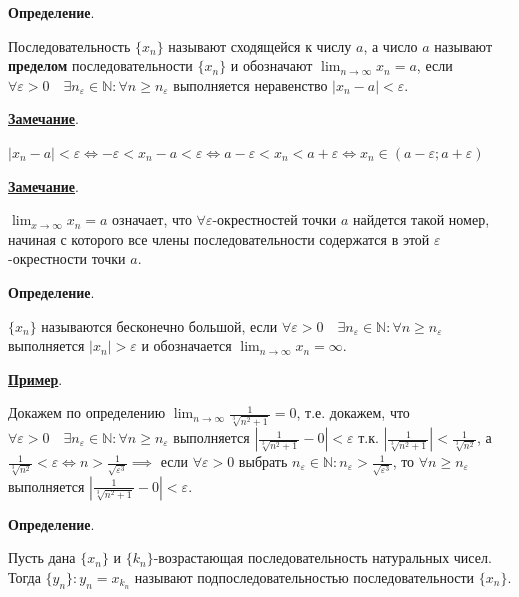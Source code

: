 \documentclass[a4paper,oneside]{article}
\newcommand{\parspace}{\vspace{10pt}}
\newcommand{\dslim}{\displaystyle\lim}
\newcommand{\dslimn}{\dslim_{n \to \infty}}
\begin{document}
\parspace

\textbf{Определение}.

Последовательность $\{x_n\}$ называют сходящейся к числу $a$, а число $a$ называют
\textbf{пределом} последовательности $\{x_n\}$ и обозначают 
$\displaystyle\lim_{n \rightarrow \infty} x_n = a$, если 
$\forall \varepsilon > 0 \quad \exists n_\varepsilon \in \mathbb{N}: \forall n \ge n_\varepsilon$
выполняется неравенство $|x_n - a| < \varepsilon$.

\parspace

\underline{\textbf{Замечание}}.

$|x_n - a| < \varepsilon \Leftrightarrow -\varepsilon < x_n - a < \varepsilon 
\Leftrightarrow a - \varepsilon < x_n < a + \varepsilon
\Leftrightarrow x_n \in (a - \varepsilon; a + \varepsilon)$

\parspace

\underline{\textbf{Замечание}}.

$\displaystyle\lim_{x \rightarrow \infty} x_n = a$ означает, что
$\forall \varepsilon$-окрестностей точки $a$ найдется такой номер, 
начиная с которого все члены последовательности содержатся в этой
$\varepsilon$-окрестности точки $a$.

\parspace

\textbf{Определение}.

$\{x_n\}$ называются бесконечно большой, если
$\forall \varepsilon > 0 \quad \exists n_\varepsilon \in \mathbb{N}:
\forall n \ge n_\varepsilon$ выполняется $|x_n| > \varepsilon$ и
обозначается $\dslimn x_n = \infty$.

\parspace

\underline{\textbf{Пример}}.

Докажем по определению 
$\dslimn \frac{1}{\sqrt[3]{n^2 + 1}} = 0$,
т.е. докажем, что $\forall \varepsilon > 0 \quad \exists n_\varepsilon \in \mathbb{N}:
\forall n \ge n_\varepsilon$ выполняется $\left|\frac{1}{\sqrt[3]{n^2 + 1}} - 0\right| < \varepsilon$
т.к. $\left|\frac{1}{\sqrt[3]{n^2 + 1}}\right| < \frac{1}{\sqrt[3]{n^2}}$,
а $\frac{1}{\sqrt[3]{n^2}} < \varepsilon \Leftrightarrow n > \frac{1}{\sqrt{\varepsilon^3}}
\implies$ если $\forall \varepsilon > 0$ выбрать 
$n_\varepsilon \in \mathbb{N}: n_\varepsilon > \frac{1}{\sqrt{\varepsilon^3}}$,
то $\forall n \ge n_\varepsilon$ выполняется $\left|\frac{1}{\sqrt[3]{n^2 + 1}} - 0\right| < \varepsilon$.

\parspace

\textbf{Определение}.

Пусть дана $\{x_n\}$ и $\{k_n\}$-возрастающая последовательность натуральных чисел.
Тогда $\{y_n\}: y_n = x_{k_n}$ называют подпоследовательностью последовательности $\{x_n\}$.
\end{document}
